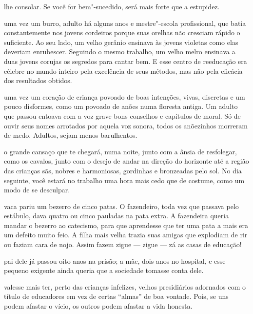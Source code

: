 \pagebreak
\thispagestyle{empty}

\movetooddpage


 lhe consolar. Se você for bem"-sucedido, será mais forte que a
estupidez.



 uma vez um burro, adulto há alguns anos e mestre"-escola
profissional, que batia constantemente nos jovens cordeiros porque suas
orelhas não cresciam rápido o suficiente. Ao seu lado, um velho gerânio
ensinava às jovens violetas como elas deveriam enrubescer. Seguindo o
mesmo trabalho, um velho melro ensinava a duas jovens corujas os
segredos para cantar bem. E esse centro de reeducação era célebre no
mundo inteiro pela excelência de seus métodos, mas não pela eficácia dos
resultados obtidos.



 uma vez um coração de criança povoado de boas intenções, vivas,
discretas e um pouco disformes, como um povoado de anões numa floresta
antiga. Um adulto que passou entoava com a voz grave bons conselhos e
capítulos de moral. Só de ouvir seus nomes arrotados por aquela voz
sonora, todos os anõezinhos morreram de medo. Adultos, sejam menos
barulhentos.


\pagebreak

 o grande cansaço que te chegará, numa noite, junto com a ânsia de
resfolegar, como os cavalos, junto com o desejo de andar na direção do
horizonte até a região das crianças sãs, nobres e harmoniosas, gordinhas
e bronzeadas pelo sol. No dia seguinte, você estará no trabalho uma hora
mais cedo que de costume, como um modo de se desculpar.



 vaca pariu um bezerro de cinco patas. O fazendeiro, toda vez que
passava pelo estábulo, dava quatro ou cinco pauladas na pata extra. A
fazendeira queria mandar o bezerro ao catecismo, para que aprendesse que
ter uma pata a mais era um defeito muito feio. A filha mais velha trazia
suas amigas que explodiam de rir ou faziam cara de nojo. Assim fazem
zigue --- zigue --- zá as casas de educação!



 pai dele já passou oito anos na prisão; a mãe, dois anos no hospital,
e esse pequeno exigente ainda queria que a sociedade tomasse conta dele.

\pagebreak

 valesse mais ter, perto das crianças infelizes, velhos
presidiários adornados com o título de educadores em vez de certas
``almas'' de boa vontade. Pois, se uns podem afastar o vício, os outros
podem afastar a vida honesta.



